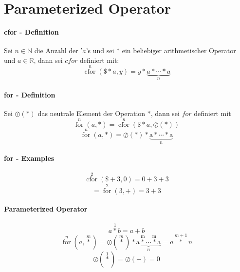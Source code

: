 \documentclass{article}
\begin{document}
\section{Parameterized Operator}
\paragraph{cfor - Definition \newline}

Sei $n \in \mathbb{N}$ die Anzahl der '$a$'s und sei $\ast$ ein beliebiger arithmetischer Operator und $a \in \mathbb{R}$, dann sei $cfor$ definiert mit:
\[ \operatorname*{cfor}^{n}\left(\$\ast a,y\right) = y\ast\underbrace{a\ast\dotsb\ast a}_{n} \]

\paragraph{for - Definition \newline}
Sei $\oslash\left(\ast\right)$ das neutrale Element der Operation $\ast$, dann sei $for$ definiert mit
\[ \operatorname*{for}^{n}\left(a,\ast \right) = \operatorname*{cfor}^{n}\left(\$\ast a,\oslash\left(\ast\right)\right)\]
\[ \operatorname*{for}^n \left(a, \ast \right) = \oslash\left(\ast\right) \ast \operatorname*{\underbrace{a \ast \dotsb \ast a}}_{n} \]

\paragraph{for - Examples}

\[ \operatorname*{cfor}^{2}\left(\$+3,0\right) = 0+3+3 \]
\[ = \operatorname*{for}^{2}\left(3,+\right) = 3+3 \]

\paragraph{Parameterized Operator}
\[ a \operatorname*{\ast}^1 b = a + b \]
\[ \operatorname*{for}^{n}\left(a,\operatorname*{\ast}^m\right) = \oslash\left(\operatorname*{\ast}^m \right) \ast \operatorname*{\underbrace{a \operatorname*{\ast}^m \dotsb \operatorname*{\ast}^m a}}_n = a\operatorname*{\ast}^{m+1}n\]
\[ \oslash\left(\operatorname*{\ast}^1\right) = \oslash\left(+\right) = 0 \]
\end{document}
